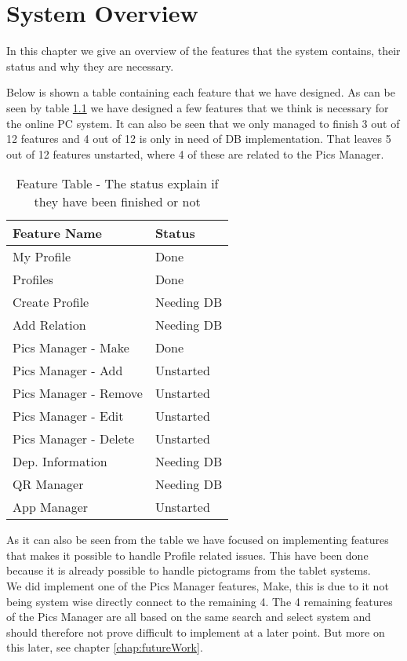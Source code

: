 \chapter{System Overview}
\label{chap:systemOverview}
In this chapter we give an overview of the features that the system contains, their status and why they are necessary.

Below is shown a table containing each feature that we have designed. As can be seen by table \ref{tab:FeatureTable} we have designed a few features that we think is necessary for the online PC system. It can also be seen that we only managed to finish 3 out of 12 features and 4 out of 12 is only in need of DB implementation. That leaves 5 out of 12 features unstarted, where 4 of these are related to the Pics Manager.

\begin{table}[htbp]
	\centering
		\begin{tabular}{|l|l|}
			\hline
			Feature Name & Status\\\hline
			My Profile & Done\\\hline
			Profiles & Done\\\hline
			Create Profile & Needing DB\\\hline
			Add Relation & Needing DB\\\hline
			Pics Manager - Make & Done\\\hline
			Pics Manager - Add & Unstarted\\\hline
			Pics Manager - Remove & Unstarted\\\hline
			Pics Manager - Edit & Unstarted\\\hline
			Pics Manager - Delete & Unstarted\\\hline
			Dep. Information & Needing DB\\\hline
			QR Manager & Needing DB\\\hline
			App Manager & Unstarted\\\hline
		\end{tabular}
	\caption{Feature Table - The status explain if they have been finished or not}
	\label{tab:FeatureTable}
\end{table}

As it can also be seen from the table we have focused on implementing features that makes it possible to handle Profile related issues. This have been done because it is already possible to handle pictograms from the tablet systems.\\
We did implement one of the Pics Manager features, Make, this is due to it not being system wise directly connect to the remaining 4. The 4 remaining features of the Pics Manager are all based on the same search and select system and should therefore not prove difficult to implement at a later point. But more on this later, see chapter \vref{chap:futureWork}.


